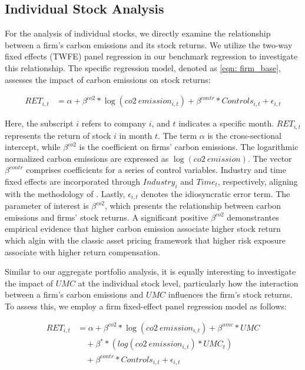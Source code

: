 \documentclass[12pt]{article}
\begin{document}
\subsection{Individual Stock Analysis}
For the analysis of individual stocks, we directly examine the relationship between a firm's carbon emissions and its stock returns. We utilize the two-way fixed effects (TWFE) panel regression in our benchmark regression to investigate this relationship. The specific regression model, denoted as \ref{eqn: firm_base}, assesses the impact of carbon emissions on stock returns:

\begin{align}
    \label{eqn: firm_base}
    RET_{i, t} &= \alpha + \beta^{co2}*\log(co2 \: emission_{i, t}) + \beta^{contr}*Controls_{i, t} + \epsilon_{i, t}
\end{align}
    
Here, the subscript $i$ refers to company $i$, and $t$ indicates a specific month. $RET_{i, t}$ represents the return of stock $i$ in month $t$. The term $\alpha$ is the cross-sectional intercept, while $\beta^{co2}$ is the coefficient on firms' carbon emissions. The logarithmic normalized carbon emissions are expressed as $\log(co2 \: emission)$. The vector $\beta^{contr}$ comprises coefficients for a series of control variables. Industry and time fixed effects are incorporated through $Industry_{i}$ and $Time_{t}$, respectively, aligning with the methodology of \citet{bolton2021investors}. Lastly, $\epsilon_{i, t}$ denotes the idiosyncratic error term. The parameter of interest is $\beta^{co2}$, which presents the relationship between carbon emissions and firms' stock returns. A significant positive $\beta^{co2}$ demonstrantes empirical evidence that higher carbon emission associate higher stock return which algin with the classic asset pricing framework that higher risk exposure associate with higher return compensation.

Similar to our aggregate portfolio analysis, it is equally interesting to investigate the impact of $UMC$ at the individual stock level, particularly how the interaction between a firm's carbon emissions and $UMC$ influences the firm's stock returns. To assess this, we employ a firm fixed-effect panel regression model as follows:

\begin{align}
    \label{eqn: firm_interaction}
    RET_{i, t} &= \alpha + \beta^{co2}*\log(co2 \: emission_{i, t}) + \beta^{umc}*UMC \nonumber \\
               &\quad + \beta^* *(log(co2 \: emission_{i, t})*UMC_{t}) \nonumber \\
               &\quad + \beta^{contr}*Controls_{i, t} + \epsilon_{i, t}
\end{align}
\end{document}
